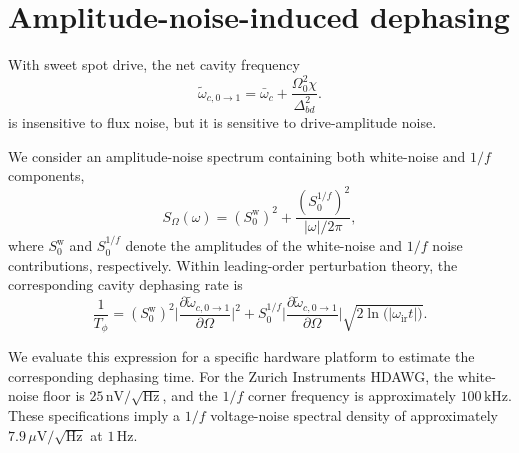 \section{Amplitude-noise-induced dephasing}
\label{app:amplitude_noise}
With sweet spot drive, the net cavity frequency
\begin{equation}
\widetilde{\omega}_{c,0\rightarrow 1}=\bar{\omega}_c+\frac{\Omega_0^2\chi}{\Delta_{bd}^2}.
\end{equation}
is insensitive to flux noise, but it is sensitive to drive-amplitude noise. 

We consider an amplitude-noise spectrum containing both white-noise and $1/f$ components,
\begin{equation}
    S_\Omega(\omega) = (S_0^\text{w})^2 + \frac{(S_0^{1/f})^2}{|\omega|/2\pi},
\end{equation}
where $S_0^\text{w}$ and $S_0^{1/f}$ denote the amplitudes of the white-noise and $1/f$ noise contributions, respectively. Within leading-order perturbation theory, the corresponding cavity dephasing rate is
\begin{equation}
    \frac{1}{T_\phi}
    =
    (S_0^\text{w})^2
    \bigg|\frac{\partial \widetilde{\omega}_{c,0\rightarrow 1}}{\partial \Omega}\bigg|^2
    +
    S_0^{1/f}
    \bigg|\frac{\partial \widetilde{\omega}_{c,0\rightarrow 1}}{\partial \Omega}\bigg|
    \sqrt{2\ln\!\bigl(|\omega_\text{ir} t|\bigr)}.
\end{equation}

We evaluate this expression for a specific hardware platform to estimate the corresponding dephasing time. For the Zurich Instruments HDAWG, the white-noise floor is $25\,\mathrm{nV}/\sqrt{\mathrm{Hz}}$, and the $1/f$ corner frequency is approximately $100\,\mathrm{kHz}$. These specifications imply a $1/f$ voltage-noise spectral density of approximately $7.9\,\mu\mathrm{V}/\sqrt{\mathrm{Hz}}$ at $1\,\mathrm{Hz}$.

